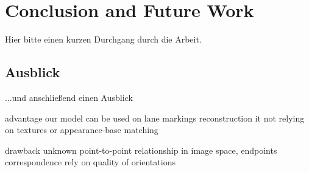 
\chapter{Conclusion and Future Work}
\label{chap:zusfas}
Hier bitte einen kurzen Durchgang durch die Arbeit.

\section*{Ausblick}
...und anschließend einen Ausblick

advantage
our model can be used on lane markings reconstruction
it 
not relying on textures or appearance-base matching


drawback
unknown point-to-point relationship in image space, endpoints correspondence rely on quality of orientations


